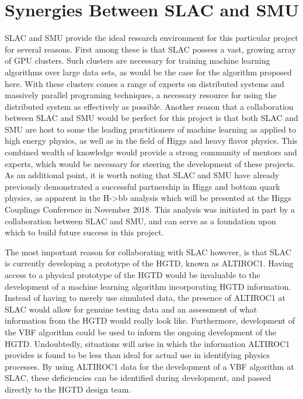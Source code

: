 \documentclass[12pt,letterpaper]{article}
\begin{document}
\section*{Synergies Between SLAC and SMU}
    SLAC and SMU provide the ideal research environment for this particular project for several reasons. First among these is that SLAC possess a vast, growing array of GPU clusters. Such clusters are necessary for training machine learning algorithms over large data sets, as would be the case for the algorithm proposed here. With these clusters comes a range of experts on distributed systems and massively parallel programing techniques, a necessary resource for using the distributed system as effectively as possible. Another reason that a collaboration between SLAC and SMU would be perfect for this project is that both SLAC and SMU are host to some the leading practitioners of machine learning as applied to high energy physics, as well as in the field of Higgs and heavy flavor physics. This combined wealth of knowledge would provide a strong community of mentors and experts, which would be necessary for steering the development of these projects. As an additional point, it is worth noting that SLAC and SMU have already previously demonstrated a successful partnership in Higgs and bottom quark physics, as apparent in the H->bb analysis which will be presented at the Higgs Couplings Conference in November 2018. This analysis was initiated in part by a collaboration between SLAC and SMU, and can serve as a foundation upon which to build future success in this project.
    
    The most important reason for collaborating with SLAC however, is that SLAC is currently developing a prototype of the HGTD, known as ALTIROC1. Having access to a physical prototype of the HGTD would be invaluable to the development of a machine learning algorithm incorporating HGTD information. Instead of having to merely use simulated data, the presence of ALTIROC1 at SLAC would allow for genuine testing data and an assessment of what information from the HGTD would really look like. Furthermore, development of the VBF algorithm could be used to inform the ongoing development of the HGTD. Undoubtedly, situations will arise in which the information ALTIROC1 provides is found to be less than ideal for actual use in identifying physics processes. By using ALTIROC1 data for the development of a VBF algorithm at SLAC, these deficiencies can be identified during development, and passed directly to the HGTD design team. 
\end{document}
